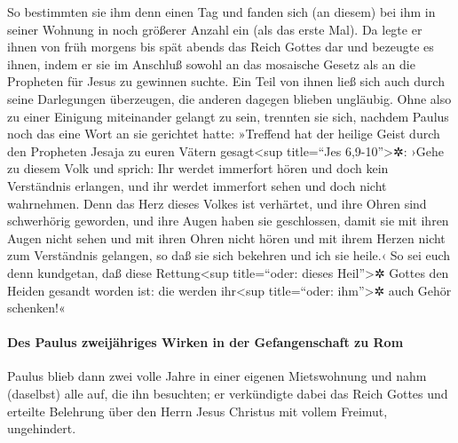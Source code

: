  So bestimmten sie ihm denn einen Tag und fanden sich (an
diesem) bei ihm in seiner Wohnung in noch größerer Anzahl ein (als das
erste Mal). Da legte er ihnen von früh morgens bis spät abends das Reich
Gottes dar und bezeugte es ihnen, indem er sie im Anschluß sowohl an das
mosaische Gesetz als an die Propheten für Jesus zu gewinnen suchte.
 Ein Teil von ihnen ließ sich auch durch seine
Darlegungen überzeugen, die anderen dagegen blieben ungläubig.
 Ohne also zu einer Einigung miteinander gelangt zu sein,
trennten sie sich, nachdem Paulus noch das eine Wort an sie gerichtet
hatte: »Treffend hat der heilige Geist durch den Propheten Jesaja zu
euren Vätern gesagt\textless sup title=``Jes 6,9-10''\textgreater✲:
 ›Gehe zu diesem Volk und sprich: Ihr werdet immerfort
hören und doch kein Verständnis erlangen, und ihr werdet immerfort sehen
und doch nicht wahrnehmen.  Denn das Herz dieses Volkes
ist verhärtet, und ihre Ohren sind schwerhörig geworden, und ihre Augen
haben sie geschlossen, damit sie mit ihren Augen nicht sehen und mit
ihren Ohren nicht hören und mit ihrem Herzen nicht zum Verständnis
gelangen, so daß sie sich bekehren und ich sie heile.‹ 
So sei euch denn kundgetan, daß diese Rettung\textless sup title=``oder:
dieses Heil''\textgreater✲ Gottes den Heiden gesandt worden ist:
 die werden ihr\textless sup title=``oder:
ihm''\textgreater✲ auch Gehör schenken!«

\hypertarget{des-paulus-zweijuxe4hriges-wirken-in-der-gefangenschaft-zu-rom}{%
\paragraph{Des Paulus zweijähriges Wirken in der Gefangenschaft zu
Rom}\label{des-paulus-zweijuxe4hriges-wirken-in-der-gefangenschaft-zu-rom}}

 Paulus blieb dann zwei volle Jahre in einer eigenen
Mietswohnung und nahm (daselbst) alle auf, die ihn besuchten;
 er verkündigte dabei das Reich Gottes und erteilte
Belehrung über den Herrn Jesus Christus mit vollem Freimut, ungehindert.

